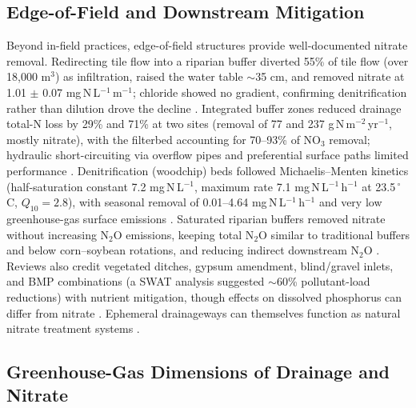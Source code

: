 \subsection{Edge-of-Field and Downstream Mitigation}

Beyond in-field practices, edge-of-field structures provide well-documented nitrate removal. Redirecting tile flow into a riparian buffer diverted 55\% of tile flow (over 18,000 m$^3$) as infiltration, raised the water table $\sim$35 cm, and removed nitrate at 1.01 $\pm$ 0.07 mg\,N\,L$^{-1}$\,m$^{-1}$; chloride showed no gradient, confirming denitrification rather than dilution drove the decline \parencite{Jaynes2014}. Integrated buffer zones reduced drainage total-N loss by 29\% and 71\% at two sites (removal of 77 and 237 g\,N\,m$^{-2}$\,yr$^{-1}$, mostly nitrate), with the filterbed accounting for 70--93\% of NO$_3$ removal; hydraulic short-circuiting via overflow pipes and preferential surface paths limited performance \parencite{Carstensen2021}. Denitrification (woodchip) beds followed Michaelis--Menten kinetics (half-saturation constant 7.2 mg\,N\,L$^{-1}$, maximum rate 7.1 mg\,N\,L$^{-1}$\,h$^{-1}$ at 23.5\,$^{\circ}$C, $Q_{10}=2.8$), with seasonal removal of 0.01--4.64 mg\,N\,L$^{-1}$\,h$^{-1}$ and very low greenhouse-gas surface emissions \parencite{Ghane2015}. Saturated riparian buffers removed nitrate without increasing N$_2$O emissions, keeping total N$_2$O similar to traditional buffers and below corn--soybean rotations, and reducing indirect downstream N$_2$O \parencite{Davis2019}. Reviews also credit vegetated ditches, gypsum amendment, blind/gravel inlets, and BMP combinations (a SWAT analysis suggested $\sim$60\% pollutant-load reductions) with nutrient mitigation, though effects on dissolved phosphorus can differ from nitrate \parencite{Ward2018}. Ephemeral drainageways can themselves function as natural nitrate treatment systems \parencite{Schilling2007}.

\subsection{Greenhouse-Gas Dimensions of Drainage and Nitrate}

